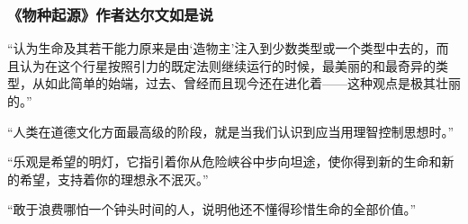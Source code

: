 \subsubsection*{《物种起源》作者达尔文如是说}

“认为生命及其若干能力原来是由‘造物主’注入到少数类型或一个类型中去的，而且认为在这个行星按照引力的既定法则继续运行的时候，最美丽的和最奇异的类型，从如此简单的始端，过去、曾经而且现今还在进化着——这种观点是极其壮丽的。”
\par

“人类在道德文化方面最高级的阶段，就是当我们认识到应当用理智控制思想时。”
\par

“乐观是希望的明灯，它指引着你从危险峡谷中步向坦途，使你得到新的生命和新的希望，支持着你的理想永不泯灭。”
\par

“敢于浪费哪怕一个钟头时间的人，说明他还不懂得珍惜生命的全部价值。”
\par
